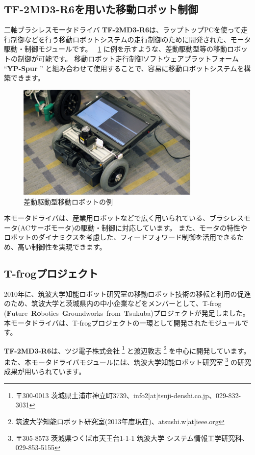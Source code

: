 \documentclass[11pt,a4j,openany,fleqn]{jbook}
\begin{document}
\subsection{{\bf TF-2MD3-R6}を用いた移動ロボット制御}
二軸ブラシレスモータドライバ {\bf TF-2MD3-R6}は、ラップトップPCを使って走行制御などを行う移動ロボットシステムの走行制御のために開発された、モータ駆動・制御モジュールです。
\figurename~\ref{fig:example_robot} に例を示すような、差動駆動型等の移動ロボットの制御が可能です。
移動ロボット走行制御ソフトウェアプラットフォーム ``{\bf YP-Spur} '' と組み合わせて使用することで、容易に移動ロボットシステムを構築できます。\par
\begin{figure}[H]
\centering\includegraphics[width=90mm]{icart-mini.eps}
\caption{差動駆動型移動ロボットの例}
\label{fig:example_robot}
\end{figure}

 本モータドライバは、産業用ロボットなどで広く用いられている、ブラシレスモータ(ACサーボモータ)の駆動・制御に対応しています。
また、モータの特性やロボットのダイナミクスを考慮した、フィードフォワード制御を活用できるため、高い制御性を実現できます。\par

\subsection{T-frogプロジェクト}
 2010年に、筑波大学知能ロボット研究室の移動ロボット技術の移転と利用の促進のため、筑波大学と茨城県内の中小企業などをメンバーとして、T-frog ({\bf{F}}uture~{\bf{Ro}}botics~{\bf{G}}roundworks~from~{\bf{T}}sukuba)プロジェクトが発足しました。
本モータドライバは、T-frogプロジェクトの一環として開発されたモジュールです。\par

{\bf TF-2MD3-R6}は、ツジ電子株式会社
\footnote{ 〒300-0013 茨城県土浦市神立町3739、info2[at]tsuji-denshi.co.jp、029-832-3031}
と渡辺敦志
\footnote{ 筑波大学知能ロボット研究室(2013年度現在)、atsushi.w[at]ieee.org}
を中心に開発しています。
また、本モータドライバモジュールには、筑波大学知能ロボット研究室
\footnote{ 〒305-8573 茨城県つくば市天王台1-1-1 筑波大学 システム情報工学研究科、029-853-5155}
の研究成果が用いられています。\par
\end{document}
